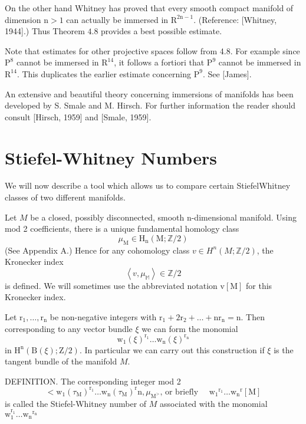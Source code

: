 \documentclass[10pt]{article}
\begin{document}
On the other hand Whitney has proved that every smooth compact manifold of dimension $\mathrm{n}>1$ can actually be immersed in $\mathrm{R}^{2 \mathrm{n}-1}$. (Reference: [Whitney, 1944].) Thus Theorem $4.8$ provides a best possible estimate.

Note that estimates for other projective spaces follow from 4.8. For example since $\mathrm{P}^{8}$ cannot be immersed in $\mathrm{R}^{14}$, it follows a fortiori that $\mathrm{P}^{9}$ cannot be immersed in $\mathrm{R}^{14}$. This duplicates the earlier estimate concerning $\mathrm{P}^{9}$. See [James].

An extensive and beautiful theory concerning immersions of manifolds has been developed by S. Smale and M. Hirsch. For further information the reader should consult [Hirsch, 1959] and [Smale, 1959].

\section{Stiefel-Whitney Numbers}
We will now describe a tool which allows us to compare certain StiefelWhitney classes of two different manifolds.

Let $M$ be a closed, possibly disconnected, smooth n-dimensional manifold. Using mod 2 coefficients, there is a unique fundamental homology class
$$
\mu_{\mathrm{M}} \in \mathrm{H}_{\mathrm{n}}(\mathrm{M} ; \mathbb{Z} / 2)
$$
(See Appendix A.) Hence for any cohomology class $v \in H^{n}(M ; \mathbb{Z} / 2)$, the Kronecker index
$$
\left\langle v, \mu_{\mathbb{M}}\right\rangle \in \mathbb{Z} / 2
$$
is defined. We will sometimes use the abbreviated notation $\mathrm{v}[\mathrm{M}]$ for this Kronecker index.

Let $\mathrm{r}_{1}, \ldots, \mathrm{r}_{\mathrm{n}}$ be non-negative integers with $\mathrm{r}_{1}+2 \mathrm{r}_{2}+\ldots+\mathrm{nr}_{\mathrm{n}}=\mathrm{n}$. Then corresponding to any vector bundle $\xi$ we can form the monomial
$$
\mathrm{w}_{1}(\xi)^{\mathrm{r}_{1}} \ldots \mathrm{w}_{\mathrm{n}}(\xi)^{\mathrm{r}_{\mathrm{n}}}
$$
in $\mathrm{H}^{\mathrm{n}}(\mathrm{B}(\xi) ; \mathrm{Z} / 2)$. In particular we can carry out this construction if $\xi$ is the tangent bundle of the manifold $M$.

DEFINITION. The corresponding integer mod 2
$$
<\mathrm{w}_{1}\left(\tau_{\mathrm{M}}\right)^{\mathrm{r}_{1}} \ldots \mathrm{w}_{\mathrm{n}}\left(\tau_{\mathrm{M}}\right)^{\mathrm{r}} \mathrm{n}, \mu_{\mathrm{M}^{>}} \text {, or briefly } \quad \mathrm{w}_{1}{ }^{\mathrm{r}_{1}} \ldots \mathrm{w}_{\mathrm{n}}{ }^{\mathrm{r}}[\mathrm{M}]
$$
is called the Stiefel-Whitney number of $M$ associated with the monomial $\mathrm{w}_{1}^{\mathrm{r}_{1}} \ldots \mathrm{w}_{\mathrm{n}}{ }^{\mathrm{r}_{\mathrm{n}}}$
\end{document}
